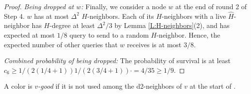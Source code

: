 \begin{proof}

\textit{Being dropped at $w$:} Finally, we consider a node $w$ at the end of round 2 of Step 4. $w$ has at most $\Delta^2$ $H$-neighbors. Each of its $H$-neighbors with a live $\hat{H}$-neighbor has $H$-degree at least $\Delta^2/3$ by Lemma \ref{L:H-neighbors}(2), 
and has expected at most $1/8$ query to send to a random $H$-neighbor. 
Hence, the expected number of other queries that $w$ receives is at most $3/8$. 

\textit{Combined probability of being dropped:} The probability of survival is at least $c_6 \ge 1/(2(1/4+1)) 1/(2(3/4+1)) \cdot = 4/35 \ge 1/9$.
\end{proof}

A color is \emph{$v$-good} if it is not used among the d2-neighbors of $v$ at the start of .

